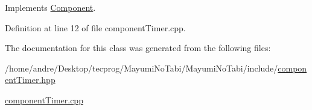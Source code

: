 Implements \hyperlink{class_component_a20c791684d452b36fcce40ac9038c735}{Component}.



Definition at line 12 of file component\-Timer.\-cpp.



The documentation for this class was generated from the following files\-:\begin{DoxyCompactItemize}
\item 
/home/andre/\-Desktop/tecprog/\-Mayumi\-No\-Tabi/\-Mayumi\-No\-Tabi/include/\hyperlink{component_timer_8hpp}{component\-Timer.\-hpp}\item 
\hyperlink{component_timer_8cpp}{component\-Timer.\-cpp}\end{DoxyCompactItemize}
